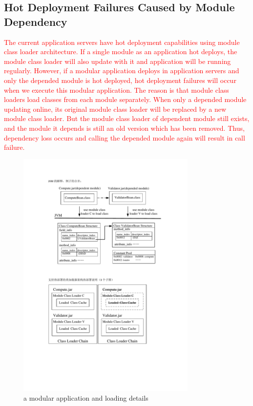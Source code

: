 \documentclass[conference]{IEEEtran}
\begin{document}
\subsection{Hot Deployment Failures Caused by Module Dependency}

\textcolor{red}{The current application servers have hot deployment capabilities using module class loader architecture.
}\textcolor{red}{If a single module as an application hot deploys, the module class loader will also update with it and application will be running regularly.
However, if a modular application deploys in application servers and only the depended module is hot deployed, hot deployment failures will occur when we execute this modular application.
The reason is that module class loaders load classes from each module separately.
When only a depended module updating online, its original module class loader will be replaced by a new module class loader.
But the module class loader of dependent module still exists, and the module it depends is still an old version which has been removed.
Thus, dependency loss occurs and calling the depended module again will result in call failure.
}

\begin{figure}[ht]
\centering
\includegraphics[width=3.5in]{ExampleJVM.pdf}
\caption{a modular application and loading details}
\label{fig:example_jvm}
\end{figure}
\end{document}
